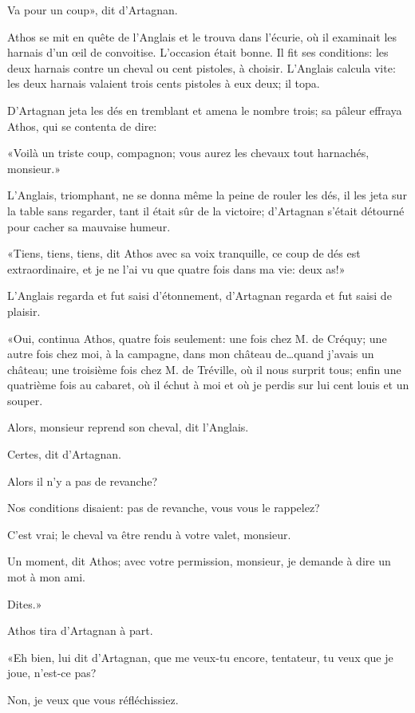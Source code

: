 \speak  Va pour un coup», dit d'Artagnan. 

Athos se mit en quête de l'Anglais et le trouva dans l'écurie, où il examinait les harnais d'un œil de convoitise. L'occasion était bonne. Il fit ses conditions: les deux harnais contre un cheval ou cent pistoles, à choisir. L'Anglais calcula vite: les deux harnais valaient trois cents pistoles à eux deux; il topa. 

D'Artagnan jeta les dés en tremblant et amena le nombre trois; sa pâleur effraya Athos, qui se contenta de dire: 

«Voilà un triste coup, compagnon; vous aurez les chevaux tout harnachés, monsieur.» 

L'Anglais, triomphant, ne se donna même la peine de rouler les dés, il les jeta sur la table sans regarder, tant il était sûr de la victoire; d'Artagnan s'était détourné pour cacher sa mauvaise humeur. 

«Tiens, tiens, tiens, dit Athos avec sa voix tranquille, ce coup de dés est extraordinaire, et je ne l'ai vu que quatre fois dans ma vie: deux as!» 

L'Anglais regarda et fut saisi d'étonnement, d'Artagnan regarda et fut saisi de plaisir. 

«Oui, continua Athos, quatre fois seulement: une fois chez M. de Créquy; une autre fois chez moi, à la campagne, dans mon château de\dots quand j'avais un château; une troisième fois chez M. de Tréville, où il nous surprit tous; enfin une quatrième fois au cabaret, où il échut à moi et où je perdis sur lui cent louis et un souper. 

\speak  Alors, monsieur reprend son cheval, dit l'Anglais. 

\speak  Certes, dit d'Artagnan. 

\speak  Alors il n'y a pas de revanche? 

\speak  Nos conditions disaient: pas de revanche, vous vous le rappelez? 

\speak  C'est vrai; le cheval va être rendu à votre valet, monsieur. 

\speak  Un moment, dit Athos; avec votre permission, monsieur, je demande à dire un mot à mon ami. 

\speak  Dites.» 

Athos tira d'Artagnan à part. 

«Eh bien, lui dit d'Artagnan, que me veux-tu encore, tentateur, tu veux que je joue, n'est-ce pas? 

\speak  Non, je veux que vous réfléchissiez. 


